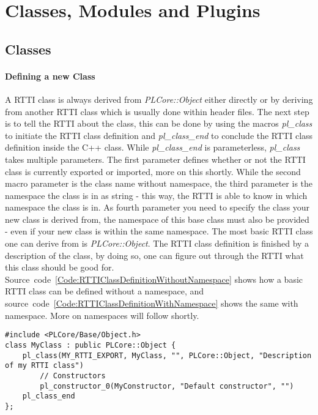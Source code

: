 \section{Classes, Modules and Plugins}
\label{Chapter:ClassesModulesAndPlugins}



\subsection{Classes}
\paragraph{Defining a new Class}
A RTTI class is always derived from \emph{PLCore::Object} either directly or by deriving from another RTTI class which is usually done within header files. The next step is to tell the RTTI about the class, this can be done by using the macros \emph{pl\_class} to initiate the RTTI class definition and \emph{pl\_class\_end} to conclude the RTTI class definition inside the C++ class. While \emph{pl\_class\_end} is parameterless, \emph{pl\_class} takes multiple parameters. The first parameter defines whether or not the RTTI class is currently exported or imported, more on this shortly. While the second macro parameter is the class name without namespace, the third parameter is the namespace the class is in as string - this way, the RTTI is able to know in which namespace the class is in. As fourth parameter you need to specify the class your new class is derived from, the namespace of this base class must also be provided - even if your new class is within the same namespace. The most basic RTTI class one can derive from is \emph{PLCore::Object}. The RTTI class definition is finished by a description of the class, by doing so, one can figure out through the RTTI what this class should be good for. Source~code~\ref{Code:RTTIClassDefinitionWithoutNamespace} shows how a basic RTTI class can be defined without a namespace, and source~code~\ref{Code:RTTIClassDefinitionWithNamespace} shows the same with namespace. More on namespaces will follow shortly.
\begin{lstlisting}[float=htb,label=Code:RTTIClassDefinitionWithoutNamespace,caption={Defining a new RTTI class without namespace}]
#include <PLCore/Base/Object.h>
class MyClass : public PLCore::Object {
	pl_class(MY_RTTI_EXPORT, MyClass, "", PLCore::Object, "Description of my RTTI class")
		// Constructors
		pl_constructor_0(MyConstructor, "Default constructor", "")
	pl_class_end
};
\end{lstlisting}
